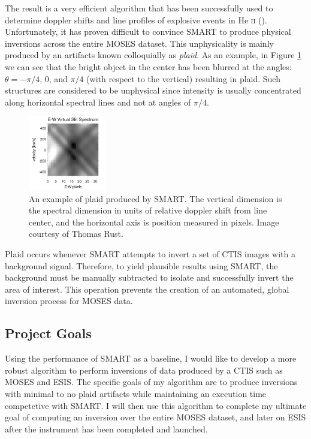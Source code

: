 \documentclass[10pt, letter]{article}
\begin{document}
			The result is a very efficient algorithm that has been successfully used to determine doppler shifts and line profiles of explosive events in He \textsc{ii} (\cite{rust1}).
			Unfortunately, it has proven difficult to convince SMART to produce physical inversions across the entire MOSES dataset. This unphysicality is mainly produced by an artifacts known colloquially as \textit{plaid}. As an example, in Figure \ref{plaid} we can see that the bright object in the center has been blurred at the angles: $\theta=-\pi/4$, 0, and $\pi/4$ (with respect to the vertical) resulting in plaid. Such structures are considered to be unphysical since intensity is usually concentrated along horizontal spectral lines and not at angles of $\pi/4$.
			\begin{figure}[h!]
				\centering
				\includegraphics[width=0.3\textwidth]{figures/plaid}
				\caption{An example of plaid produced by SMART. The vertical dimension is the spectral dimension in units of relative doppler shift from line center, and the horizontal axis is position measured in pixels. Image courtesy of Thomas Rust.}
				\label{plaid}
			\end{figure}
			
			Plaid occurs whenever SMART attempts to invert a set of CTIS images with a background signal. Therefore, to yield plausible results using SMART, the background must be manually subtracted to isolate and successfully invert the area of interest. This operation prevents the creation of an automated, global inversion process for MOSES data.

		\subsection{Project Goals}
		
			Using the performance of SMART as a baseline, I would like to develop a more robust algorithm to perform inversions of data produced by a CTIS such as MOSES and ESIS. The specific goals of my algorithm are to produce inversions with minimal to no plaid artifacts while maintaining an execution time competetive with SMART. I will then use this algorithm to complete my ultimate goal of computing an inversion over the entire MOSES dataset, and later on ESIS after the instrument has been completed and launched.
		
\end{document}
